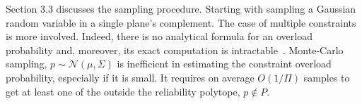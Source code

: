 Section 3.3 discusses the sampling procedure. Starting with sampling a Gaussian random variable in a single plane's complement.%
The case of multiple constraints is more involved. Indeed, there is no analytical formula for an overload probability and, moreover, its exact computation is intractable~\cite{khachiyan1989problem}. 
Monte-Carlo sampling, $p\sim \mathcal{N}(\mu, \Sigma)$ is inefficient in estimating the constraint overload probability, especially if it is small. It requires on average $O(1/\Pi)$ samples to get at least one of the outside the reliability polytope, $p\not\in P$.

